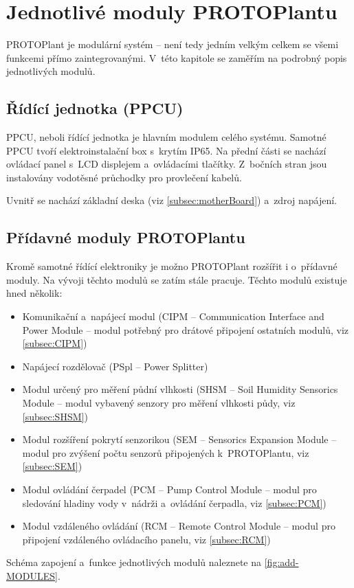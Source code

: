 \chapter{Jednotlivé moduly PROTOPlantu}
PROTOPlant je modulární systém -- není tedy jedním velkým celkem se všemi funkcemi přímo zaintegrovanými.
V~této kapitole se zaměřím na podrobný popis jednotlivých modulů.

\section{Řídící jednotka (PPCU)}
PPCU, neboli řídící jednotka je hlavním modulem celého systému.
Samotné PPCU tvoří elektroinstalační box s~krytím IP65.
Na přední části se nachází ovládací panel s~LCD displejem a~ovládacími tlačítky.
Z~bočních stran jsou instalovány vodotěsné průchodky pro provlečení kabelů.

Uvnitř se nachází základní deska (viz \autoref{subsec:motherBoard}) a~zdroj napájení.

\section{Přídavné moduly PROTOPlantu}
Kromě samotné řídící elektroniky je možno PROTOPlant rozšířit i o~přídavné moduly. 
Na vývoji těchto modulů se zatím stále pracuje.
Těchto modulů existuje hned několik:

\begin{itemize}
    \item Komunikační a~napájecí modul (CIPM -- Communication Interface and Power Module -- modul potřebný pro drátové připojení ostatních modulů, viz \autoref{subsec:CIPM})
    \item Napájecí rozdělovač (PSpl -- Power Splitter)
    \item Modul určený pro měření půdní vlhkosti (SHSM -- Soil Humidity Sensorics Module -- modul vybavený senzory pro měření vlhkosti půdy, viz \autoref{subsec:SHSM})
    \item Modul rozšíření pokrytí senzorikou (SEM -- Sensorics Expansion Module -- modul pro zvýšení počtu senzorů připojených k~PROTOPlantu, viz \autoref{subsec:SEM})
    \item Modul ovládání čerpadel (PCM -- Pump Control Module -- modul pro sledování hladiny vody v~nádrži a~ovládání čerpadla, viz \autoref{subsec:PCM})
    \item Modul vzdáleného ovládání (RCM -- Remote Control Module -- modul pro připojení vzdáleného ovládacího panelu, viz \autoref{subsec:RCM})
\end{itemize}
Schéma zapojení a~funkce jednotlivých modulů naleznete na \autoref{fig:add-MODULES}.

